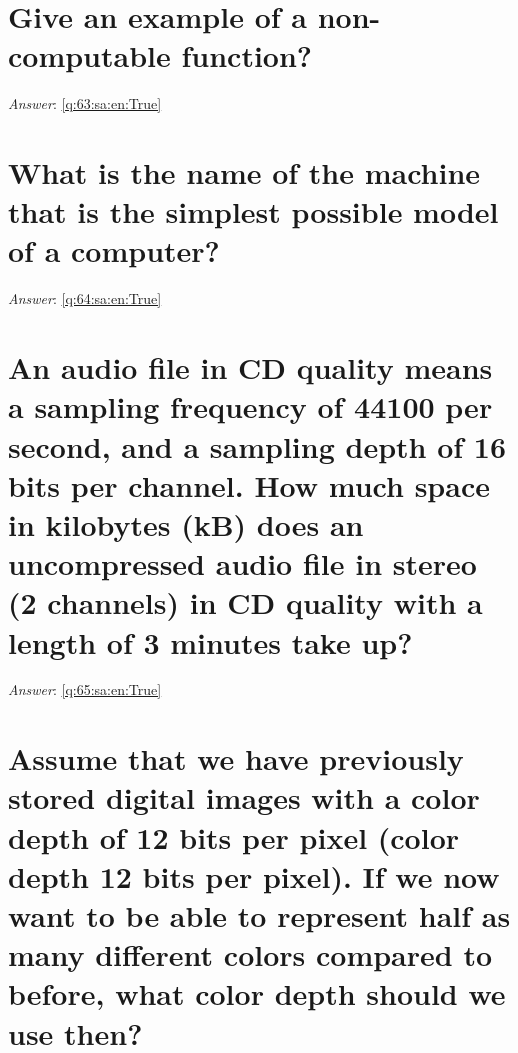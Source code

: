 \documentclass[a4paper,11pt,oneside]{book}
\begin{document}
\begin{sloppypar}
\section{Give an example of a non-computable function?}

\label{q:63:sa:en:False}

\vspace{2cm}

\noindent\makebox[\textwidth]{\hrulefill}

\vspace{1cm}

\textit{Answer}: \autoref{q:63:sa:en:True}



\section{What is the name of the machine that is the simplest possible model of a computer?}

\label{q:64:sa:en:False}

\vspace{2cm}

\noindent\makebox[\textwidth]{\hrulefill}

\vspace{1cm}

\textit{Answer}: \autoref{q:64:sa:en:True}



\section{An audio file in CD quality means a sampling frequency of 44100 per second, and a sampling depth of 16 bits per channel. How much space in kilobytes (kB) does an uncompressed audio file in stereo (2 channels) in CD quality with a length of 3 minutes take up?}

\label{q:65:sa:en:False}

\vspace{2cm}

\noindent\makebox[\textwidth]{\hrulefill}

\vspace{1cm}

\textit{Answer}: \autoref{q:65:sa:en:True}



\section{Assume that we have previously stored digital images with a color depth of 12 bits per pixel (color depth 12 bits per pixel). If we now want to be able to represent half as many different colors compared to before, what color depth should we use then?}


\end{sloppypar}
\end{document}
